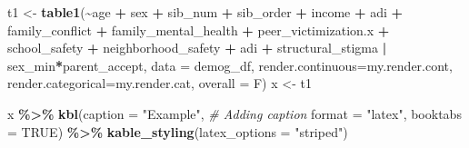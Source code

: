 \documentclass[
]{article}
\newenvironment{Shaded}{\begin{snugshade}}{\end{snugshade}}
\newcommand{\AttributeTok}[1]{\textcolor[rgb]{0.13,0.29,0.53}{#1}}
\newcommand{\CommentTok}[1]{\textcolor[rgb]{0.56,0.35,0.01}{\textit{#1}}}
\newcommand{\ConstantTok}[1]{\textcolor[rgb]{0.56,0.35,0.01}{#1}}
\newcommand{\FunctionTok}[1]{\textcolor[rgb]{0.13,0.29,0.53}{\textbf{#1}}}
\newcommand{\NormalTok}[1]{#1}
\newcommand{\OtherTok}[1]{\textcolor[rgb]{0.56,0.35,0.01}{#1}}
\newcommand{\SpecialCharTok}[1]{\textcolor[rgb]{0.81,0.36,0.00}{\textbf{#1}}}
\newcommand{\StringTok}[1]{\textcolor[rgb]{0.31,0.60,0.02}{#1}}
\begin{document}
\begin{Shaded}
\begin{Highlighting}[]
\NormalTok{t1 }\OtherTok{\textless{}{-}} \FunctionTok{table1}\NormalTok{(}\SpecialCharTok{\textasciitilde{}}\NormalTok{age }\SpecialCharTok{+}\NormalTok{ sex }\SpecialCharTok{+}\NormalTok{ sib\_num }\SpecialCharTok{+}\NormalTok{ sib\_order }\SpecialCharTok{+}\NormalTok{ income }\SpecialCharTok{+}\NormalTok{ adi }\SpecialCharTok{+} 
\NormalTok{               family\_conflict }\SpecialCharTok{+}\NormalTok{ family\_mental\_health }\SpecialCharTok{+}\NormalTok{ peer\_victimization.x }\SpecialCharTok{+} 
\NormalTok{               school\_safety }\SpecialCharTok{+}\NormalTok{ neighborhood\_safety }\SpecialCharTok{+}\NormalTok{ adi }\SpecialCharTok{+}\NormalTok{ structural\_stigma }\SpecialCharTok{|}\NormalTok{ sex\_min}\SpecialCharTok{*}\NormalTok{parent\_accept, }
             \AttributeTok{data =}\NormalTok{ demog\_df, }
             \AttributeTok{render.continuous=}\NormalTok{my.render.cont, }
             \AttributeTok{render.categorical=}\NormalTok{my.render.cat, }\AttributeTok{overall =}\NormalTok{ F)}
\NormalTok{x }\OtherTok{\textless{}{-}}\NormalTok{ t1}
\end{Highlighting}
\end{Shaded}

\begin{Shaded}
\begin{Highlighting}[]
\NormalTok{x }\SpecialCharTok{\%\textgreater{}\%}
    \FunctionTok{kbl}\NormalTok{(}\AttributeTok{caption =} \StringTok{"Example"}\NormalTok{, }\CommentTok{\# Adding caption  }
        \AttributeTok{format =} \StringTok{"latex"}\NormalTok{, }\AttributeTok{booktabs =} \ConstantTok{TRUE}\NormalTok{) }\SpecialCharTok{\%\textgreater{}\%}
  \FunctionTok{kable\_styling}\NormalTok{(}\AttributeTok{latex\_options =} \StringTok{"striped"}\NormalTok{)}
\end{Highlighting}
\end{Shaded}
\end{document}

